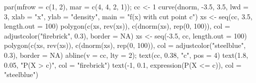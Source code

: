 \documentclass[
  letterpaper,
  DIV=11,
  numbers=noendperiod]{scrreprt}
\newenvironment{Shaded}{\begin{snugshade}}{\end{snugshade}}
\newcommand{\AttributeTok}[1]{\textcolor[rgb]{0.40,0.45,0.13}{#1}}
\newcommand{\ConstantTok}[1]{\textcolor[rgb]{0.56,0.35,0.01}{#1}}
\newcommand{\DecValTok}[1]{\textcolor[rgb]{0.68,0.00,0.00}{#1}}
\newcommand{\FloatTok}[1]{\textcolor[rgb]{0.68,0.00,0.00}{#1}}
\newcommand{\FunctionTok}[1]{\textcolor[rgb]{0.28,0.35,0.67}{#1}}
\newcommand{\NormalTok}[1]{\textcolor[rgb]{0.00,0.23,0.31}{#1}}
\newcommand{\OtherTok}[1]{\textcolor[rgb]{0.00,0.23,0.31}{#1}}
\newcommand{\SpecialCharTok}[1]{\textcolor[rgb]{0.37,0.37,0.37}{#1}}
\newcommand{\StringTok}[1]{\textcolor[rgb]{0.13,0.47,0.30}{#1}}
\begin{document}
\begin{Shaded}
\begin{Highlighting}[]
\FunctionTok{par}\NormalTok{(}\AttributeTok{mfrow =} \FunctionTok{c}\NormalTok{(}\DecValTok{1}\NormalTok{, }\DecValTok{2}\NormalTok{), }\AttributeTok{mar =} \FunctionTok{c}\NormalTok{(}\DecValTok{4}\NormalTok{, }\DecValTok{4}\NormalTok{, }\DecValTok{2}\NormalTok{, }\DecValTok{1}\NormalTok{)); cc }\OtherTok{\textless{}{-}} \DecValTok{1}
\FunctionTok{curve}\NormalTok{(dnorm, }\SpecialCharTok{{-}}\FloatTok{3.5}\NormalTok{, }\FloatTok{3.5}\NormalTok{, }\AttributeTok{lwd =} \DecValTok{3}\NormalTok{, }\AttributeTok{xlab =} \StringTok{"x"}\NormalTok{, }\AttributeTok{ylab =} \StringTok{"density"}\NormalTok{,}
      \AttributeTok{main =} \StringTok{"f(x) with cut point c"}\NormalTok{)}
\NormalTok{xs }\OtherTok{\textless{}{-}} \FunctionTok{seq}\NormalTok{(cc, }\FloatTok{3.5}\NormalTok{, }\AttributeTok{length.out =} \DecValTok{100}\NormalTok{)}
\FunctionTok{polygon}\NormalTok{(}\FunctionTok{c}\NormalTok{(xs, }\FunctionTok{rev}\NormalTok{(xs)), }\FunctionTok{c}\NormalTok{(}\FunctionTok{dnorm}\NormalTok{(xs), }\FunctionTok{rep}\NormalTok{(}\DecValTok{0}\NormalTok{, }\DecValTok{100}\NormalTok{)),}
        \AttributeTok{col =} \FunctionTok{adjustcolor}\NormalTok{(}\StringTok{"firebrick"}\NormalTok{, }\FloatTok{0.3}\NormalTok{), }\AttributeTok{border =} \ConstantTok{NA}\NormalTok{)}
\NormalTok{xs }\OtherTok{\textless{}{-}} \FunctionTok{seq}\NormalTok{(}\SpecialCharTok{{-}}\FloatTok{3.5}\NormalTok{, cc, }\AttributeTok{length.out =} \DecValTok{100}\NormalTok{)}
\FunctionTok{polygon}\NormalTok{(}\FunctionTok{c}\NormalTok{(xs, }\FunctionTok{rev}\NormalTok{(xs)), }\FunctionTok{c}\NormalTok{(}\FunctionTok{dnorm}\NormalTok{(xs), }\FunctionTok{rep}\NormalTok{(}\DecValTok{0}\NormalTok{, }\DecValTok{100}\NormalTok{)),}
        \AttributeTok{col =} \FunctionTok{adjustcolor}\NormalTok{(}\StringTok{"steelblue"}\NormalTok{, }\FloatTok{0.3}\NormalTok{), }\AttributeTok{border =} \ConstantTok{NA}\NormalTok{)}
\FunctionTok{abline}\NormalTok{(}\AttributeTok{v =}\NormalTok{ cc, }\AttributeTok{lty =} \DecValTok{2}\NormalTok{); }\FunctionTok{text}\NormalTok{(cc, }\FloatTok{0.38}\NormalTok{, }\StringTok{"c"}\NormalTok{, }\AttributeTok{pos =} \DecValTok{4}\NormalTok{)}
\FunctionTok{text}\NormalTok{(}\FloatTok{1.8}\NormalTok{, }\FloatTok{0.05}\NormalTok{, }\StringTok{"P(X \textgreater{} c)"}\NormalTok{, }\AttributeTok{col =} \StringTok{"firebrick"}\NormalTok{)}
\FunctionTok{text}\NormalTok{(}\SpecialCharTok{{-}}\DecValTok{1}\NormalTok{, }\FloatTok{0.1}\NormalTok{, }\FunctionTok{expression}\NormalTok{(}\FunctionTok{P}\NormalTok{(X }\SpecialCharTok{\textless{}=}\NormalTok{ c)), }\AttributeTok{col =} \StringTok{"steelblue"}\NormalTok{)}

\end{Highlighting}
\end{Shaded}
\end{document}
